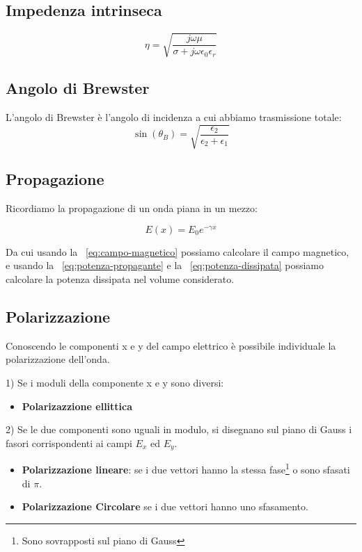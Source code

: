 \documentclass[10pt,a4paper]{report}
\begin{document}
	\subsection{Impedenza intrinseca}
		\[
		\eta=\sqrt{\frac{j\omega\mu}{\sigma+j\omega\epsilon_0\epsilon_r}}
		\]
		

	\subsection{Angolo di Brewster}

	L'angolo di Brewster è l'angolo di incidenza a cui abbiamo trasmissione totale:
	\[
	\sin(\theta_B)=\sqrt{\frac{\epsilon_2}{\epsilon_2+\epsilon_1}}
	\]




	\subsection{Propagazione}
	Ricordiamo la propagazione di un onda piana in un mezzo:
	

	\[
	E(x)=E_0e^{-\gamma x}
	\]
	
	Da cui usando la ~\ref{eq:campo-magnetico} possiamo calcolare il campo magnetico, e usando la ~\ref{eq:potenza-propagante} e la ~\ref{eq:potenza-dissipata} possiamo calcolare la potenza dissipata nel volume considerato.


	\subsection{Polarizzazione}

	Conoscendo le componenti x e y del campo elettrico è possibile individuale la polarizzazione dell'onda.

	\raggedright	{1) Se i moduli della componente x e y sono diversi:}

	\begin{itemize} 
	\item \textbf{Polarizazzione ellittica}
	\end{itemize}
	\raggedright{	2) Se le due componenti sono uguali in modulo, si disegnano sul piano di Gauss i fasori corrispondenti ai campi $E_x$ ed $E_y$.}
	\begin{itemize}
	\item \textbf{Polarizzazione lineare}: se i due vettori hanno la stessa fase\footnote{Sono sovrapposti sul piano di Gauss} o sono sfasati di $\pi$.
	\item \textbf{Polarizzazione Circolare} se i due vettori hanno uno sfasamento.
	\end{itemize}
		
\end{document}
